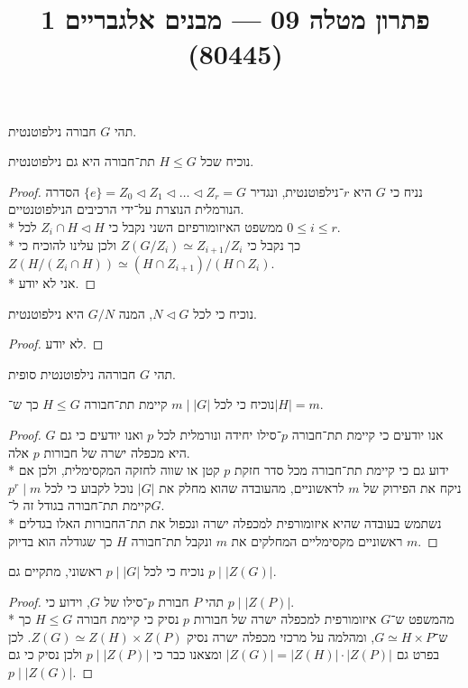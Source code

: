 
\title{פתרון מטלה 09 --- מבנים אלגבריים 1 (80445)}


\maketitle
\maketitleprint{}

\Question{}
תהי $G$ חבורה נילפוטנטית.

\Subquestion{}
נוכיח שכל $H \le G$ תת־חבורה היא גם נילפוטנטית.
\begin{proof}
	נניח כי $G$ היא $r$־נילפוטנטית, ונגדיר $\{e\} = Z_0 \triangleleft Z_1 \triangleleft \dots \triangleleft Z_r = G$ הסדרה הנורמלית הנוצרת על־ידי הרכיבים הנילפוטנטיים. \\*
	ממשפט האיזומורפיזם השני נקבל כי $Z_i \cap H \triangleleft H$ לכל $0 \le i \le r$. \\*
	כך נקבל כי $Z(G/Z_i) \simeq Z_{i + 1} / Z_i$ ולכן עלינו להוכיח כי $Z(H / (Z_i \cap H)) \simeq (H \cap Z_{i + 1}) / (H \cap Z_i)$. \\*
	אני לא יודע.
\end{proof}

\Subquestion{}
נוכיח כי לכל $N \triangleleft G$, המנה $G / N$ היא נילפוטנטית.
\begin{proof}
	לא יודע.
\end{proof}

\Question{}
תהי $G$ חבורהה נילפוטנטית סופית.

\Subquestion{}
נוכיח כי לכל $m \mid |G|$ קיימת תת־חבורה $H \le G$ כך ש־$|H| = m$.
\begin{proof}
	אנו יודעים כי קיימת תת־חבורה $p$־סילו יחידה ונורמלית לכל $p$ ואנו יודעים כי גם $G$ היא מכפלה ישרה של חבורות $p$ אלה. \\*
	ידוע גם כי קיימת תת־חבורה מכל סדר חזקת $p$ קטן או שווה לחזקה המקסימלית, ולכן אם ניקח את הפירוק של $m$ לראשוניים, מהעובדה שהוא מחלק את $|G|$ נוכל לקבוע כי לכל $p^r \mid m$ קיימת תת־חבורה בגודל זה ל־$G$. \\*
	נשתמש בעובדה שהיא איזומורפית למכפלה ישרה ונכפול את תת־החבורות האלו בגדלים ראשוניים מקסימליים המחלקים את $m$ ונקבל תת־חבורה $H$ כך שגודלה הוא בדיוק $m$.
\end{proof}

\Subquestion{}
נוכיח כי לכל $p \mid |G|$ ראשוני, מתקיים גם $p \mid |Z(G)|$.
\begin{proof}
	תהי $P$ חבורת $p$־סילו של $G$, וידוע כי $p \mid |Z(P)|$. \\*
	מהמשפט ש־$G$ איזומורפית למכפלה ישרה של חבורות $p$ נסיק כי קיימת חבורה $H \le G$ כך ש־$G \simeq H \times P$, ומהלמה על מרכזי מכפלה ישרה נסיק $Z(G) \simeq Z(H) \times Z(P)$.
	לכן בפרט גם $|Z(G)| = |Z(H)| \cdot |Z(P)|$ ומצאנו כבר כי $p \mid |Z(P)|$ ולכן נסיק כי גם $p \mid |Z(G)|$.
\end{proof}

